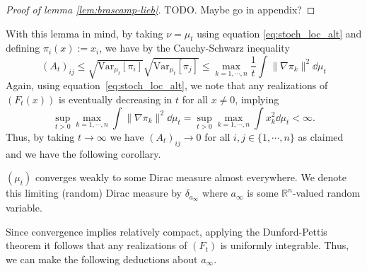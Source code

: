 \begin{proof}[Proof of lemma \ref{lem:brascamp-lieb}]
  TODO. Maybe go in appendix?
\end{proof}

With this lemma in mind, by taking \(\nu = \mu_t\) using equation \ref{eq:stoch_loc_alt} and defining
\(\pi_i(x) := x_i\), we have by the Cauchy-Schwarz inequality
\[(A_t)_{ij} \le \sqrt{\text{Var}_{\mu_t}[\pi_i]}\sqrt{\text{Var}_{\mu_t}[\pi_j]} 
  \le \max_{k = 1, \cdots, n} \frac{1}{t}\int \|\nabla \pi_k\|^2 \dd \mu_t\]
Again, using equation~\ref{eq:stoch_loc_alt}, we note that any realizations of \((F_t(x))\) is eventually 
decreasing in \(t\) for all \(x \neq 0\), implying 
\[\sup_{t > 0} \max_{k = 1, \cdots, n} \int \|\nabla \pi_k\|^2 \dd \mu_t = 
\sup_{t > 0} \max_{k = 1, \cdots, n} \int x_k^2 \dd \mu_t < \infty.\] 
Thus, by taking \(t \to \infty\) we have \((A_t)_{ij} \to 0\) for all \(i, j \in \{1, \cdots, n\}\) as claimed 
and we have the following corollary.

\begin{corollary}
  \((\mu_t)\) converges weakly to some Dirac measure almost everywhere. We denote this 
  limiting (random) Dirac measure by \(\delta_{a_\infty}\) where \(a_\infty\) is some 
  \(\mathbb{R}^n\)-valued random variable.
\end{corollary}

Since convergence implies relatively compact, applying the Dunford-Pettis theorem it follows that 
any realizations of \((F_t)\) is uniformly integrable. Thus, we can make the following deductions 
about \(a_\infty\).

